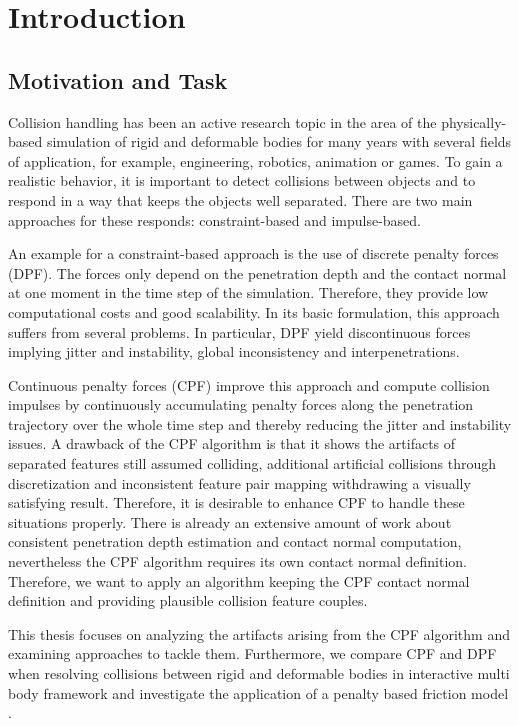 \chapter{Introduction}
\label{ch:intro}

\section{Motivation and Task}
Collision handling has been an active research topic in the area of the physically-based simulation of rigid and deformable bodies for many years with several fields of application, for example, engineering, robotics, animation or games.
To gain a realistic behavior, it is important to detect collisions between objects and to respond in a way that keeps the objects well separated. There are two main approaches for these responds: constraint-based and impulse-based.

An example for a constraint-based approach is the use of discrete penalty forces (DPF). The forces only depend on the penetration depth and the contact normal at one moment in the time step of the simulation. Therefore, they provide low computational costs and good scalability. In its basic formulation, this approach suffers from several problems. In particular, DPF yield discontinuous forces implying jitter and instability, global inconsistency and interpenetrations.


Continuous penalty forces (CPF) \cite{TANG2012} improve this approach and compute collision impulses by continuously accumulating penalty forces along the penetration trajectory over the whole time step and thereby reducing the jitter and instability issues.
A drawback of the CPF algorithm is that it shows the artifacts of separated features still assumed colliding, additional artificial collisions through discretization and inconsistent feature pair mapping withdrawing a visually satisfying result.
Therefore, it is desirable to enhance CPF to handle these situations properly. There is already an extensive amount of work about consistent penetration depth estimation and contact normal computation, nevertheless the CPF algorithm requires its own contact normal definition. Therefore, we want to apply an algorithm keeping the CPF contact normal definition and providing plausible collision feature couples.

This thesis focuses on analyzing the artifacts arising from the CPF algorithm and examining approaches to tackle them. Furthermore, we compare  CPF \cite{TANG2012} and DPF when resolving collisions between rigid and deformable bodies in interactive multi body framework and investigate the application of a penalty based friction model \cite{YAMANE2006}.

